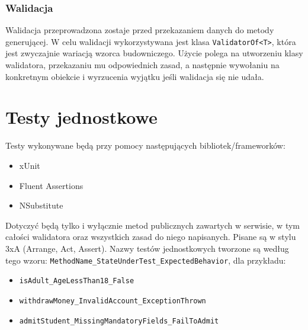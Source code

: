 \documentclass[a4paper, 10pt, titlepage]{article}
\newcommand{\code}[1]{\texttt{#1}}
\begin{document}
\subsubsection{Walidacja}

Walidacja przeprowadzona zostaje przed przekazaniem danych do metody generującej.
W celu walidacji wykorzystywana jest klasa \code{ValidatorOf<T>}, która jest zwyczajnie wariacją wzorca budowniczego. Użycie polega na utworzeniu klasy walidatora, przekazaniu mu odpowiednich zasad, a następnie wywołaniu na konkretnym obiekcie i wyrzucenia wyjątku jeśli walidacja się nie udała.

\section{Testy jednostkowe}

Testy wykonywane będą przy pomocy następujących bibliotek/frameworków:

\begin{itemize}
\item xUnit
\item Fluent Assertions
\item NSubstitute
\end{itemize}

Dotyczyć będą tylko i wyłącznie metod publicznych zawartych w serwisie, w tym całości walidatora oraz wszystkich zasad do niego napisanych.
Pisane są w stylu 3xA (Arrange, Act, Assert).
Nazwy testów jednostkowych tworzone są według tego wzoru: \code{MethodName\_StateUnderTest\_ExpectedBehavior}, dla przykładu:
\begin{itemize}
\item \code{isAdult\_AgeLessThan18\_False}
\item \code{withdrawMoney\_InvalidAccount\_ExceptionThrown}
\item \code{admitStudent\_MissingMandatoryFields\_FailToAdmit}
\end{itemize}
\end{document}
